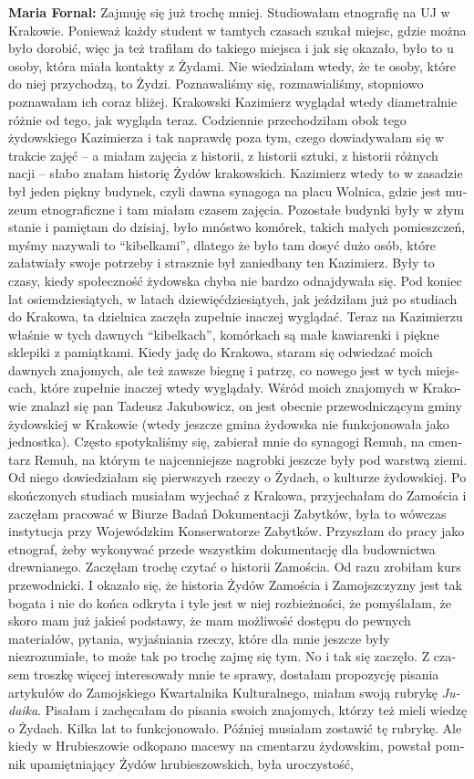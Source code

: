 \begin{otherlanguage}{ngerman}
\textbf{Maria Fornal:} Zajmuję się już trochę mniej. Studiowałam etnografię na UJ w Krakowie. Ponieważ każdy student w tamtych czasach szukał miejsc, gdzie można było dorobić, więc ja też trafiłam do takiego miejsca i jak się okazało, było to u osoby, która miała kontakty z Żydami. Nie wiedziałam wtedy, że te osoby, które do niej przychodzą, to Żydzi. Poznawaliśmy się, rozmawialiśmy, stopniowo poznawałam ich coraz bliżej. Krakowski Kazimierz wyglądał wtedy diametralnie różnie od tego, jak wygląda teraz. Codziennie przechodziłam obok tego żydowskiego Kazimierza i tak naprawdę poza tym, czego dowiadywałam się w trakcie zajęć – a miałam zajęcia z historii, z historii sztuki, z historii różnych nacji – słabo znałam historię Żydów krakowskich. Kazimierz wtedy to w zasadzie był jeden piękny budynek, czyli dawna synagoga na placu Wolnica, gdzie jest muzeum etnograficzne i tam miałam czasem zajęcia. Pozostałe budynki były w złym stanie i pamiętam do dzisiaj, było mnóstwo komórek, takich małych pomieszczeń, myśmy nazywali to "`kibelkami"', dlatego że było tam dosyć dużo osób, które załatwiały swoje potrzeby i strasznie był zaniedbany ten Kazimierz. Były to czasy, kiedy społeczność żydowska chyba nie bardzo odnajdywała się. Pod koniec lat osiemdziesiątych, w latach dziewięćdziesiątych, jak jeździłam już po studiach do Krakowa, ta dzielnica zaczęła zupełnie inaczej wyglądać. Teraz na Kazimierzu właśnie w tych dawnych "`kibelkach"', komórkach są małe kawiarenki i piękne sklepiki z pamiątkami. Kiedy jadę do Krakowa, staram się odwiedzać moich dawnych znajomych, ale też zawsze biegnę i patrzę, co nowego jest w tych miejscach, które zupełnie inaczej wtedy wyglądały. Wśród moich znajomych w Krakowie znalazł się pan Tadeusz Jakubowicz, on jest obecnie przewodniczącym gminy żydowskiej w Krakowie (wtedy jeszcze gmina żydowska nie funkcjonowała jako jednostka). Często spotykaliśmy się, zabierał mnie do synagogi Remuh, na cmentarz Remuh, na którym te najcenniejsze nagrobki jeszcze były pod warstwą ziemi. Od niego dowiedziałam się pierwszych rzeczy o Żydach, o kulturze żydowskiej. Po skończonych studiach musiałam wyjechać z Krakowa, przyjechałam do Zamościa i zaczęłam pracować w Biurze Badań Dokumentacji Zabytków, była to wówczas instytucja przy Wojewódzkim Konserwatorze Zabytków. Przyszłam do pracy jako etnograf, żeby wykonywać przede wszystkim dokumentację dla budownictwa drewnianego. Zaczęłam trochę czytać o historii Zamościa. Od razu zrobiłam kurs przewodnicki. I okazało się, że historia Żydów Zamościa i Zamojszczyzny jest tak bogata i nie do końca odkryta i tyle jest w niej rozbieżności, że pomyślałam, że skoro mam już jakieś podstawy, że mam możliwość dostępu do pewnych materiałów, pytania, wyjaśniania rzeczy, które dla mnie jeszcze były niezrozumiałe, to może tak po trochę zajmę się tym. No i tak się zaczęło. Z czasem troszkę więcej interesowały mnie te sprawy, dostałam propozycję pisania artykułów do Zamojskiego Kwartalnika Kulturalnego, miałam swoją rubrykę \textit{Judaika}. Pisałam i zachęcałam do pisania swoich znajomych, którzy też mieli wiedzę o Żydach. Kilka lat to funkcjonowało. Później musiałam zostawić tę rubrykę. Ale kiedy w Hrubieszowie odkopano macewy na cmentarzu żydowskim, powstał pomnik upamiętniający Żydów hrubieszowskich, była uroczystość, 
\end{otherlanguage}
